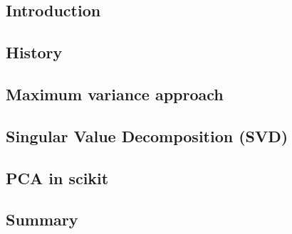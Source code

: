 

\subsection{Introduction}


\clearpage




\subsection{History}

\clearpage




\subsection{Maximum variance approach} \label{section:standardApproach}

\clearpage




\subsection{Singular Value Decomposition (SVD)}

\clearpage



\subsection{PCA in scikit}

\clearpage


\subsection{Summary}

\clearpage
